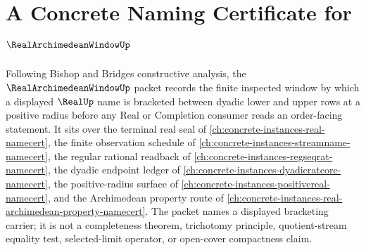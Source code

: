 \chapter{A Concrete Naming Certificate for $\RealArchimedeanWindowUp$}
\label{ch:concrete-instances-real-archimedean-window-namecert}

Following Bishop and Bridges constructive analysis, the $\RealArchimedeanWindowUp$ packet records the finite inspected window by which a displayed $\RealUp$ name is bracketed between dyadic lower and upper rows at a positive radius before any Real or Completion consumer reads an order-facing statement. It sits over the terminal real seal of \autoref{ch:concrete-instances-real-namecert}, the finite observation schedule of \autoref{ch:concrete-instances-streamname-namecert}, the regular rational readback of \autoref{ch:concrete-instances-regseqrat-namecert}, the dyadic endpoint ledger of \autoref{ch:concrete-instances-dyadicratcore-namecert}, the positive-radius surface of \autoref{ch:concrete-instances-positivereal-namecert}, and the Archimedean property route of \autoref{ch:concrete-instances-real-archimedean-property-namecert}. The packet names a displayed bracketing carrier; it is not a completeness theorem, trichotomy principle, quotient-stream equality test, selected-limit operator, or open-cover compactness claim.

